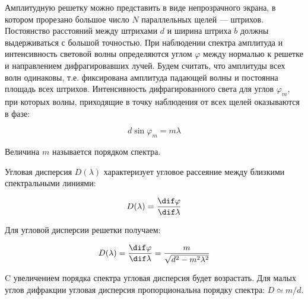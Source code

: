 	Амплитудную решетку можно представить в виде непрозрачного экрана, в котором прорезано большое число $N$ параллельных щелей --- штрихов. Постоянство расстояний между штрихами $d$ и ширина штриха $b$ должны выдерживаться с большой точностью. При наблюдении спектра амплитуда и интенсивность световой волны определяются углом $\varphi$ между нормалью к решетке и направлением дифрагировавших лучей. Будем считать, что амплитуды всех волн одинаковы, т.е. фиксирована амплитуда падающей волны и постоянна площадь всех штрихов. Интенсивность дифрагированного света для углов $\varphi_m$, при которых волны, приходящие в точку наблюдения от всех щелей оказываются в фазе:

	\begin{equation}\label{eq:1}
		d\sin\varphi_m = m\lambda
	\end{equation}

	Величина $m$ называется порядком спектра.

	Угловая дисперсия $D(\lambda)$ характеризует угловое рассеяние между близкими спектральными линиями:

	\begin{equation}\label{eq:2}
		D(\lambda) = \frac{\dif\varphi}{\dif\lambda}
	\end{equation}

	Для угловой дисперсии решетки получаем:

	\begin{equation}\label{eq:3}
		D(\lambda) = \frac{\dif\varphi}{\dif\lambda} = \frac{m}{\sqrt{d^2-m^2\lambda^2}}
	\end{equation}

	C увеличением порядка спектра угловая дисперсия будет возрастать. Для малых углов дифракции угловая дисперсия пропорциональна порядку спектра: $D\simeq m/d$.

